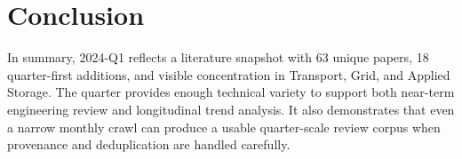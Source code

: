 \documentclass[conference]{IEEEtran}
\begin{document}
\section{Conclusion}
In summary, 2024-Q1 reflects a literature snapshot with 63 unique papers, 18 quarter-first additions, and visible concentration in Transport, Grid, and Applied Storage. The quarter provides enough technical variety to support both near-term engineering review and longitudinal trend analysis. It also demonstrates that even a narrow monthly crawl can produce a usable quarter-scale review corpus when provenance and deduplication are handled carefully.



\end{document}
